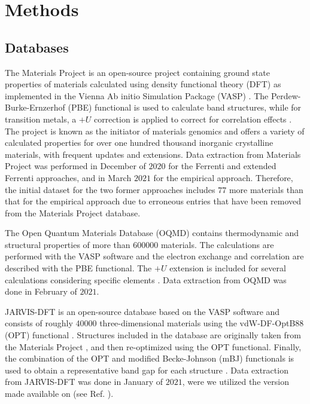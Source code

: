 \documentclass[superscriptaddress,
preprint,
 amsmath,amssymb,
 aps,
]{revtex4-2}
\begin{document}
\section*{Methods}

\subsection*{Databases}
The Materials Project \cite{Jain2013, Jain2018} is an open-source project containing ground state properties of materials calculated using density functional theory (DFT) as implemented in the Vienna Ab initio Simulation Package (VASP) \cite{Kresse1996}. The Perdew-Burke-Ernzerhof \cite{Perdew1996} (PBE) functional is used to calculate band structures, while for transition metals, a $+U$ correction is applied to correct for correlation effects \cite{Wang2006}. The project is known as the initiator of materials genomics and offers a variety of calculated properties for over one hundred thousand inorganic crystalline materials, with frequent updates and extensions. Data extraction from Materials Project was performed in December of $2020$ for the Ferrenti and extended Ferrenti approaches, and in March $2021$ for the empirical approach. Therefore, the initial dataset for the two former approaches includes $77$ more materials than that for the empirical approach due to erroneous entries that have been removed from the Materials Project database.

The Open Quantum Materials Database (OQMD) \cite{Saal2013, Kirklin2015} contains thermodynamic and structural properties of more than \num{600000} materials. The calculations are performed with the VASP software and the electron exchange and correlation are described with the PBE functional. The $+U$ extension is included for several calculations considering specific elements \cite{Stevanovic2012}. Data extraction from OQMD was done in February of $2021$.

JARVIS-DFT \cite{Choudhary2020} is an open-source database based on the VASP software and consists of roughly \num{40000} three-dimensional materials using the vdW-DF-OptB88 (OPT) functional \cite{Thonhauser2007, Klimes2011}. Structures included in the database are originally taken from the Materials Project \cite{Jain2013, Jain2018}, and then re-optimized using the OPT functional. Finally, the combination of the OPT and modified Becke-Johnson (mBJ) functionals \cite{Tran2009} is used to obtain a representative band gap for each structure \cite{Choudhary2018a}. Data extraction from JARVIS-DFT was done in January of $2021$, were we utilized the version made available on  (see Ref. \cite{Choudhary2020}).
\end{document}
